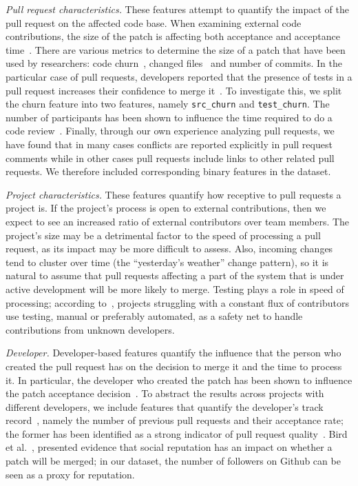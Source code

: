 \documentclass{sig-alternate}
\begin{document}
  \emph{Pull request characteristics.} These features attempt to quantify the
  impact of the pull request on the affected code base. When examining external
  code contributions, the size of the patch is affecting both acceptance and
  acceptance time~\cite{Weiss08}. There are various metrics to determine the
  size of a patch that have been used by researchers: code churn~\cite{Nagap05},
  changed files~\cite{Nagap05} and number of commits.  In the particular case of
  pull requests, developers reported that the presence of tests in a pull
  request increases their confidence to merge it~\cite{Pham13}. To investigate
  this, we split the churn feature into two features, namely \texttt{src\_churn}
  and \texttt{test\_churn}. The number of participants has been shown to
  influence the time required to do a code review~\cite{Rigby13}. Finally,
  through our own experience analyzing pull requests, we have found that in many
  cases conflicts are reported explicitly in pull request comments while in
  other cases pull requests include links to other related pull requests. We
  therefore included corresponding binary features in the dataset.

  \emph{Project characteristics.} These features quantify how receptive to pull
  requests a project is. If the project's process is open to external
  contributions, then we expect to see an increased ratio of external
  contributors over team members. The project's size may be a detrimental factor
  to the speed of processing a pull request, as its impact may be more difficult
  to assess. Also, incoming changes tend to cluster over time (the ``yesterday's
  weather'' change pattern), so it is natural to assume that pull
  requests affecting a part of the system that is under active development will
  be more likely to merge. Testing plays a role in speed of processing;
  according to~\cite{Pham13}, projects struggling with a constant flux of
  contributors use testing, manual or preferably automated, as a safety net to
  handle contributions from unknown developers.

  \emph{Developer.}  Developer-based features quantify the influence that the
  person who created the pull request has on the decision to merge it and the
  time to process it. In particular, the developer who created the patch has
  been shown to influence the patch acceptance decision~\cite{Jeong09}. To
  abstract the results across projects with different developers, we include
  features that quantify the developer's track record~\cite{Dabbi12}, namely the
  number of previous pull requests and their acceptance rate; the former has
  been identified as a strong indicator of pull request quality~\cite{Pham13}.
  Bird et al.~\cite{Bird07}, presented evidence that social reputation has an
  impact on whether a patch will be merged; in our dataset, the number of
  followers on Github can be seen as a proxy for reputation.
\end{document}
